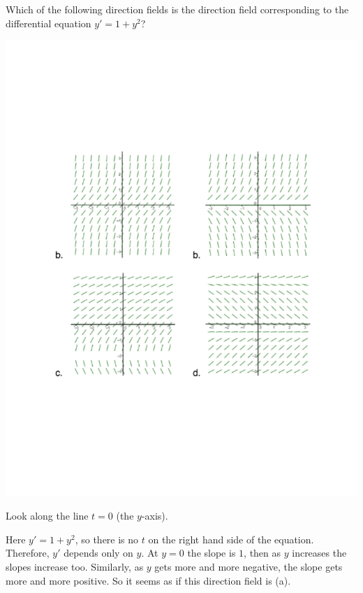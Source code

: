\documentclass[handout]{ximera}
\begin{document}
\begin{problem}
Which of the following direction fields is the direction field corresponding to the differential equation $y' = 1+y^2$?

	
	\begin{image}
	\includegraphics[trim= 250 200 250 200,scale=0.8]{Figure8-2-3.pdf}
	\end{image}
	
	\begin{freeResponse}
	Look along the line $t=0$ (the $y$-axis).

	Here $y' = 1+y^2$, so there is no $t$ on the right hand side of the equation.  
	Therefore, $y'$ depends only on $y$.  
	At $y=0$ the slope is $1$, then as $y$ increases the slopes increase too.  
	Similarly, as $y$ gets more and more negative, the slope gets more and more positive.  
	So it seems as if this direction field is (a).

	\end{freeResponse}

\end{problem}
\end{document}
